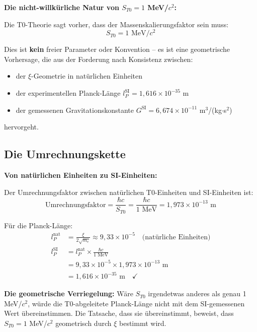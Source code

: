 \documentclass[12pt,a4paper]{article}
\begin{document}
	\begin{keyresult}
		\textbf{Die nicht-willk{\"u}rliche Natur von $S_{T0} = 1$ MeV/$c^2$:}
		
		Die T0-Theorie sagt vorher, dass der Massenskalierungsfaktor sein muss:
		\begin{equation}
			\boxed{S_{T0} = 1 \text{ MeV}/c^2}
		\end{equation}
		
		Dies ist \textbf{kein} freier Parameter oder Konvention -- es ist eine geometrische Vorhersage, die aus der Forderung nach Konsistenz zwischen:
		\begin{itemize}
			\item der $\xi$-Geometrie in nat{\"u}rlichen Einheiten
			\item der experimentellen Planck-L{\"a}nge $l_P^{\text{SI}} = 1{,}616 \times 10^{-35}$ m
			\item der gemessenen Gravitationskonstante $G^{\text{SI}} = 6{,}674 \times 10^{-11}$ m$^3$/(kg$\cdot$s$^2$)
		\end{itemize}
		hervorgeht.
	\end{keyresult}
	
	\subsection{Die Umrechnungskette}
	
	\begin{derivation}
		\textbf{Von nat{\"u}rlichen Einheiten zu SI-Einheiten:}
		
		Der Umrechnungsfaktor zwischen nat{\"u}rlichen T0-Einheiten und SI-Einheiten ist:
		\begin{equation}
			\text{Umrechnungsfaktor} = \frac{\hbar c}{S_{T0}} = \frac{\hbar c}{1 \text{ MeV}} = 1{,}973 \times 10^{-13} \text{ m}
		\end{equation}
		
		F{\"u}r die Planck-L{\"a}nge:
		\begin{align}
			l_P^{\text{nat}} &= \frac{\xi}{2\sqrt{m_e}} \approx 9{,}33 \times 10^{-5} \quad \text{(nat{\"u}rliche Einheiten)} \\
			l_P^{\text{SI}} &= l_P^{\text{nat}} \times \frac{\hbar c}{1 \text{ MeV}} \\
			&= 9{,}33 \times 10^{-5} \times 1{,}973 \times 10^{-13} \text{ m} \\
			&= 1{,}616 \times 10^{-35} \text{ m} \quad \checkmark
		\end{align}
		
		\textbf{Die geometrische Verriegelung:} W{\"a}re $S_{T0}$ irgendetwas anderes als genau 1 MeV/$c^2$, w{\"u}rde die T0-abgeleitete Planck-L{\"a}nge nicht mit dem SI-gemessenen Wert {\"u}bereinstimmen. Die Tatsache, dass sie {\"u}bereinstimmt, beweist, dass $S_{T0} = 1$ MeV/$c^2$ geometrisch durch $\xi$ bestimmt wird.
	\end{derivation}
	
\end{document}
